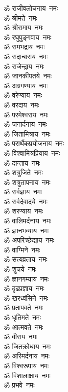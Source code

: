 \begin{multicols}{2}
\begin{flushleft}
ॐ राजीवलोचनाय~नमः\\
ॐ श्रीमते~नमः\\
ॐ श्रीरामाय~नमः\\
ॐ रघुपुङ्गवाय~नमः\\
ॐ रामभद्राय~नमः\\
ॐ सदाचाराय~नमः\\
ॐ राजेन्द्राय~नमः\\
ॐ जानकीपतये~नमः\\
ॐ अग्रगण्याय~नमः\\
ॐ वरेण्याय~नमः\hfill{}\\
ॐ वरदाय~नमः\\
ॐ परमेश्वराय~नमः\\
ॐ जनार्दनाय~नमः\\
ॐ जितामित्राय~नमः\\
ॐ परार्थैकप्रयोजनाय~नमः\\
ॐ विश्वामित्रप्रियाय~नमः\\
ॐ दान्ताय~नमः\\
ॐ शत्रुजिते~नमः\\
ॐ शत्रुतापनाय~नमः\\
ॐ सर्वज्ञाय~नमः\hfill{}\\
ॐ सर्वदेवादये~नमः\\
ॐ शरण्याय~नमः\\
ॐ वालिमर्दनाय~नमः\\
ॐ ज्ञानभव्याय~नमः\\
ॐ अपरिच्छेद्याय~नमः\\
ॐ वाग्मिने~नमः\\
ॐ सत्यव्रताय~नमः\\
ॐ शुचये~नमः\\
ॐ ज्ञानगम्याय~नमः\\
ॐ दृढप्रज्ञाय~नमः\hfill{}\\
ॐ खरध्वंसिने~नमः\\
ॐ प्रतापवते~नमः\\
ॐ धृतिमते~नमः\\
ॐ आत्मवते~नमः\\
ॐ वीराय~नमः\\
ॐ जितक्रोधाय~नमः\\
ॐ अरिमर्दनाय~नमः\\
ॐ विश्वरूपाय~नमः\\
ॐ विशालाक्षाय~नमः\\
ॐ प्रभवे~नमः\hfill{}\\

\end{flushleft}
\end{multicols}

